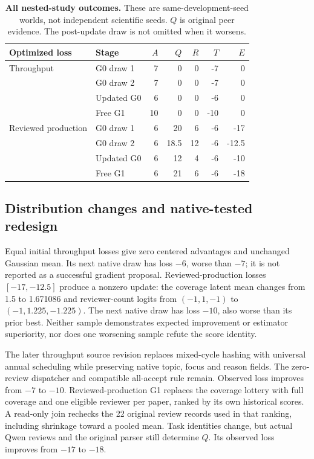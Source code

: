 \begin{table}[t]\centering\small
\caption{\textbf{All nested-study outcomes.} These are same-development-seed
worlds, not independent scientific seeds. $Q$ is original peer evidence.
The post-update draw is not omitted when it worsens.}
\label{tab:integrated-nested}
\begin{tabular}{llrrrrr}\toprule
Optimized loss & Stage & $A$ & $Q$ & $R$ & $T$ & $E$\\\midrule
Throughput & G0 draw 1 &7&0&0&-7&0\\
 & G0 draw 2 &7&0&0&-7&0\\
 & Updated G0 &6&0&0&-6&0\\
 & Free G1 &10&0&0&-10&0\\\addlinespace
Reviewed production & G0 draw 1 &6&20&6&-6&-17\\
 & G0 draw 2 &6&18.5&12&-6&-12.5\\
 & Updated G0 &6&12&4&-6&-10\\
 & Free G1 &6&21&6&-6&-18\\\bottomrule
\end{tabular}\end{table}

\subsection{Distribution changes and native-tested redesign}
Equal initial throughput losses give zero centered advantages and unchanged
Gaussian mean. Its next native draw has loss $-6$, worse than $-7$; it is not
reported as a successful gradient proposal. Reviewed-production losses
$[-17,-12.5]$ produce a nonzero update: the coverage latent mean changes from
1.5 to 1.671086 and reviewer-count logits from $(-1, 1,-1)$ to
$(-1, 1.225,-1.225)$. The next native draw has loss $-10$, also worse than its
prior best. Neither sample demonstrates expected improvement or estimator
superiority, nor does one worsening sample refute the score identity.

The later throughput source revision replaces mixed-cycle hashing with
universal annual scheduling while preserving native topic, focus and reason
fields. The zero-review dispatcher and compatible all-accept rule remain.
Observed loss improves from $-7$ to $-10$. Reviewed-production G1 replaces the
coverage lottery with full coverage and one eligible reviewer per paper, ranked
by its own historical scores. A read-only join rechecks the 22 original review
records used in that ranking, including shrinkage toward a pooled mean.
Task identities change, but actual Qwen reviews and the original parser still
determine $Q$. Its observed loss improves from $-17$ to $-18$.

